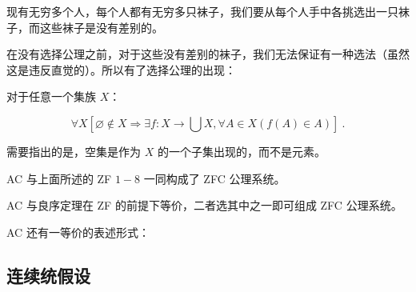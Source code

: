 现有无穷多个人，每个人都有无穷多只袜子，我们要从每个人手中各挑选出一只袜子，而这些袜子是没有差别的。

在没有选择公理之前，对于这些没有差别的袜子，我们无法保证有一种选法（虽然这是违反直觉的）。所以有了选择公理的出现：

对于任意一个集族 $X$：

$$\forall X \left[\varnothing \not \in X \Rightarrow \exists f: X \rightarrow \bigcup X, \forall A \in X\left(f(A) \in A\right)\right] ~.$$

需要指出的是，空集是作为 $X$ 的一个子集出现的，而不是元素。


AC 与上面所述的 ZF $1-8$ 一同构成了 ZFC 公理系统。

AC 与良序定理在 ZF 的前提下等价，二者选其中之一即可组成 ZFC 公理系统。

AC 还有一等价的表述形式：

\subsection{连续统假设}



